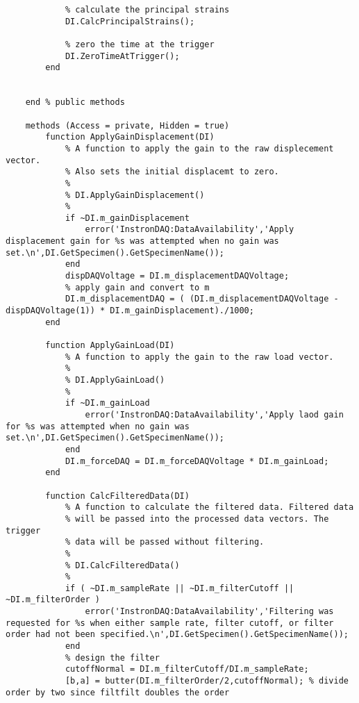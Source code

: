\begin{lstlisting}
            % calculate the principal strains
            DI.CalcPrincipalStrains();
            
            % zero the time at the trigger
            DI.ZeroTimeAtTrigger();
        end
                

    end % public methods
        
    methods (Access = private, Hidden = true)
        function ApplyGainDisplacement(DI)
            % A function to apply the gain to the raw displecement vector.
            % Also sets the initial displacemt to zero.
            %
            % DI.ApplyGainDisplacement()
            %
            if ~DI.m_gainDisplacement
                error('InstronDAQ:DataAvailability','Apply displacement gain for %s was attempted when no gain was set.\n',DI.GetSpecimen().GetSpecimenName());
            end
            dispDAQVoltage = DI.m_displacementDAQVoltage;
            % apply gain and convert to m
            DI.m_displacementDAQ = ( (DI.m_displacementDAQVoltage - dispDAQVoltage(1)) * DI.m_gainDisplacement)./1000;
        end
        
        function ApplyGainLoad(DI)
            % A function to apply the gain to the raw load vector.
            %
            % DI.ApplyGainLoad()
            %
            if ~DI.m_gainLoad
                error('InstronDAQ:DataAvailability','Apply laod gain for %s was attempted when no gain was set.\n',DI.GetSpecimen().GetSpecimenName());
            end
            DI.m_forceDAQ = DI.m_forceDAQVoltage * DI.m_gainLoad;
        end
        
        function CalcFilteredData(DI)
            % A function to calculate the filtered data. Filtered data
            % will be passed into the processed data vectors. The trigger
            % data will be passed without filtering.
            %
            % DI.CalcFilteredData()
            %
            if ( ~DI.m_sampleRate || ~DI.m_filterCutoff || ~DI.m_filterOrder )
                error('InstronDAQ:DataAvailability','Filtering was requested for %s when either sample rate, filter cutoff, or filter order had not been specified.\n',DI.GetSpecimen().GetSpecimenName());
            end
            % design the filter
            cutoffNormal = DI.m_filterCutoff/DI.m_sampleRate;
            [b,a] = butter(DI.m_filterOrder/2,cutoffNormal); % divide order by two since filtfilt doubles the order
            

\end{lstlisting}
